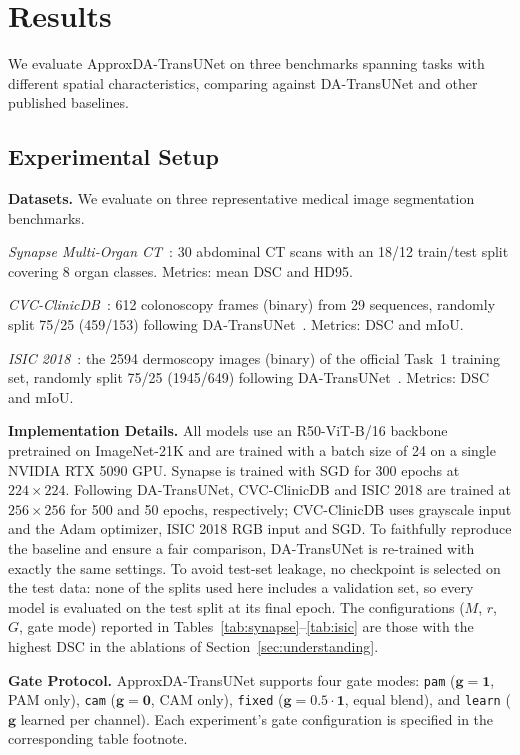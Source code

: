 \section{Results}
\label{sec:experiments}

We evaluate ApproxDA-TransUNet on three benchmarks spanning tasks with different spatial characteristics, comparing against DA-TransUNet and other published baselines.

\subsection{Experimental Setup}

\textbf{Datasets.} We evaluate on three representative medical image segmentation benchmarks.

\textit{Synapse Multi-Organ CT}~\cite{landman2015miccai}: 30 abdominal CT scans with an 18/12 train/test split covering 8 organ classes. Metrics: mean DSC and HD95.

\textit{CVC-ClinicDB}~\cite{bernal2015wm}: 612 colonoscopy frames (binary) from 29 sequences, randomly split 75/25 (459/153) following DA-TransUNet~\cite{sun2024datransunet}. Metrics: DSC and mIoU.

\textit{ISIC 2018}~\cite{codella2019isic}: the 2594 dermoscopy images (binary) of the official Task~1 training set, randomly split 75/25 (1945/649) following DA-TransUNet~\cite{sun2024datransunet}. Metrics: DSC and mIoU.

\textbf{Implementation Details.} All models use an R50-ViT-B/16 backbone pretrained on ImageNet-21K and are trained with a batch size of 24 on a single NVIDIA RTX 5090 GPU. Synapse is trained with SGD for 300 epochs at $224{\times}224$. Following DA-TransUNet, CVC-ClinicDB and ISIC 2018 are trained at $256{\times}256$ for 500 and 50 epochs, respectively; CVC-ClinicDB uses grayscale input and the Adam optimizer, ISIC 2018 RGB input and SGD. To faithfully reproduce the baseline and ensure a fair comparison, DA-TransUNet is re-trained with exactly the same settings. To avoid test-set leakage, no checkpoint is selected on the test data: none of the splits used here includes a validation set, so every model is evaluated on the test split at its final epoch. The configurations ($M$, $r$, $G$, gate mode) reported in Tables~\ref{tab:synapse}--\ref{tab:isic} are those with the highest DSC in the ablations of Section~\ref{sec:understanding}.

\textbf{Gate Protocol.} ApproxDA-TransUNet supports four gate modes: \texttt{pam} ($\mathbf{g}{=}\mathbf{1}$, PAM only), \texttt{cam} ($\mathbf{g}{=}\mathbf{0}$, CAM only), \texttt{fixed} ($\mathbf{g}{=}0.5\cdot\mathbf{1}$, equal blend), and \texttt{learn} ($\mathbf{g}$ learned per channel). Each experiment's gate configuration is specified in the corresponding table footnote.

